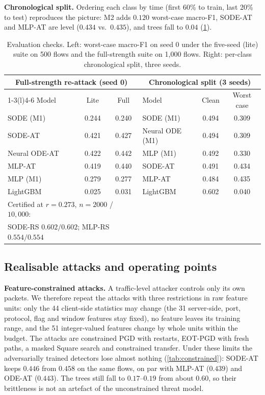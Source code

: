 \documentclass{article}
\theoremstyle{definition}
\begin{document}
\textbf{Chronological split.} Ordering each class by time (first 60\% to train,
last 20\% to test) reproduces the picture: M2 adds $0.120$ worst-case macro-F1,
SODE-AT and MLP-AT are level ($0.434$ vs.\ $0.435$), and trees fall to $0.04$
(\cref{tab:checks}).

\begin{table}[t]
\caption{Evaluation checks. Left: worst-case macro-F1 on seed 0 under the five-seed
(lite) suite on 500 flows and the full-strength suite on 1{,}000 flows. Right:
per-class chronological split, three seeds.}
\label{tab:checks}
\centering\small\setlength{\tabcolsep}{4pt}
\begin{tabular}{lcc@{\hspace{18pt}}lcc}
\toprule
\multicolumn{3}{c}{Full-strength re-attack (seed 0)} & \multicolumn{3}{c}{Chronological split (3 seeds)}\\
\cmidrule(r){1-3}\cmidrule(l){4-6}
Model & Lite & Full & Model & Clean & Worst case\\
\midrule
SODE (M1) & 0.244 & 0.240 & SODE (M1) & 0.494 & 0.309\\
SODE-AT & 0.421 & 0.427 & Neural ODE (M1) & 0.494 & 0.309\\
Neural ODE-AT & 0.422 & 0.442 & MLP (M1) & 0.492 & 0.330\\
MLP-AT & 0.419 & 0.440 & SODE-AT & 0.491 & 0.434\\
MLP (M1) & 0.279 & 0.277 & MLP-AT & 0.484 & 0.435\\
LightGBM & 0.025 & 0.031 & LightGBM & 0.602 & 0.040\\
\midrule
\multicolumn{3}{l}{Certified at $r=0.273$, $n=2000$ / $10{,}000$:} & & & \\
\multicolumn{3}{l}{\quad SODE-RS $0.602/0.602$; MLP-RS $0.554/0.554$} & & & \\
\bottomrule
\end{tabular}
\end{table}

\subsection{Realisable attacks and operating points}
\textbf{Feature-constrained attacks.} A traffic-level attacker controls only its
own packets. We therefore repeat the attacks with three restrictions in raw
feature units: only the 44 client-side statistics may change (the 31
server-side, port, protocol, flag and window features stay fixed), no feature
leaves its training range, and the 51 integer-valued features change by whole
units within the budget. The attacks are constrained PGD with restarts, EOT-PGD with fresh paths, a masked
Square search and constrained transfer. Under these limits the adversarially
trained detectors lose almost nothing (\cref{tab:constrained}): SODE-AT keeps
$0.446$ from $0.458$ on the same flows, on par with MLP-AT ($0.439$) and
ODE-AT ($0.443$). The trees still fall to $0.17$--$0.19$ from about $0.60$, so
their brittleness is not an artefact of the unconstrained threat model.
\end{document}
